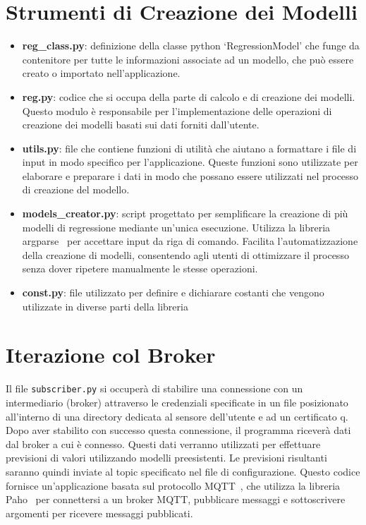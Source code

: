 \documentclass{rapportECL}
\begin{document}
\section{Strumenti di Creazione dei Modelli}
\begin{itemize}
  \item \textbf{reg\_class.py}: definizione della classe python `RegressionModel' che funge da contenitore per tutte le
  informazioni associate ad un modello, che può essere creato o importato nell'applicazione.
  \item \textbf{reg.py}: codice che si occupa della parte di calcolo e di creazione dei modelli. Questo modulo è responsabile 
  per l'implementazione delle operazioni di creazione dei modelli basati sui dati forniti dall'utente.
  \item \textbf{utils.py}: file che contiene funzioni di utilità che aiutano a formattare i file di input in modo specifico per l'applicazione. 
  Queste funzioni sono utilizzate per elaborare e preparare i dati in modo che possano essere utilizzati nel processo di creazione del modello.
  \item \textbf{models\_creator.py}: script progettato per semplificare la creazione di più modelli di regressione mediante un'unica esecuzione. 
  Utilizza la libreria argparse~\cite{argparse} per accettare input da riga di comando.  Facilita l'automatizzazione della creazione di modelli, 
  consentendo agli utenti di ottimizzare il processo senza dover ripetere manualmente le stesse operazioni.
  \item \textbf{const.py}: file utilizzato per definire e dichiarare costanti che vengono utilizzate in diverse parti della libreria
\end{itemize}

\section{Iterazione col Broker}
Il file \texttt{subscriber.py} si occuperà di stabilire una connessione con un intermediario (broker) attraverso le credenziali specificate in 
un file posizionato all'interno di una directory dedicata al sensore dell'utente e ad un certificato    q. Dopo aver stabilito con successo questa connessione, il programma riceverà 
dati dal broker a cui è connesso. Questi dati verranno utilizzati per effettuare previsioni di valori utilizzando modelli preesistenti. 
Le previsioni risultanti saranno quindi inviate al topic specificato nel file di configurazione.
Questo codice fornisce un'applicazione basata sul protocollo MQTT~\cite{mqtt}, che utilizza la libreria Paho~\cite{paho} per connettersi 
a un broker MQTT, pubblicare messaggi e sottoscrivere argomenti per ricevere messaggi pubblicati.
\end{document}
